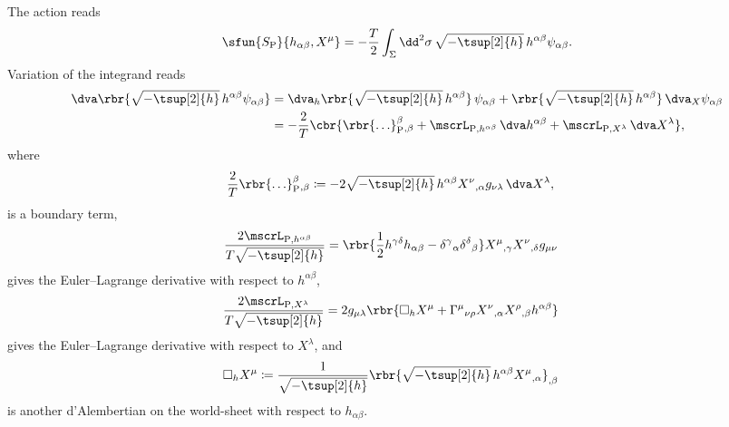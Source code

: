 \documentclass[a4paper,11pt]{article}
\begin{document}
The action reads \cite{Deser_1976,Brink_1976,Polyakov1981}
\begin{align}
\sfun{S_\text{P}}{h_{\alpha\beta}, X^{\mu}} = -\frac{T}{2} \int_{\Sigma}
\dd^2 \sigma\, \sqrt{-\tsup[2]{h}}\, h^{\alpha\beta} \psi_{\alpha\beta}.
\end{align}
Variation of the integrand reads
\begin{align}
\dva \rbr{\sqrt{-\tsup[2]{h}}\, h^{\alpha\beta} \psi_{\alpha\beta}}
&= \dva_h \rbr{\sqrt{-\tsup[2]{h}}\, h^{\alpha\beta}}\, \psi_{\alpha\beta}
+ \rbr{\sqrt{-\tsup[2]{h}}\, h^{\alpha\beta}}\, \dva_X  \psi_{\alpha\beta}
\nonumber \\
&= - \frac{2}{T} \cbr{ \rbr{\ldots}_{\text{P}}^{\beta}{}_{,\beta} + 
\mscrL_{\text{P}, h^{\alpha\beta}}\, \dva h^{\alpha\beta} +
\mscrL_{\text{P}, X^{\lambda}}\, \dva X^{\lambda} },
\end{align}
where
\begin{align}
\frac{2}{T} \rbr{\ldots}_{\text{P}}^{\beta}{}_{,\beta} &\coloneqq
- 2\sqrt{-\tsup[2]{h}}\, 
h^{\alpha\beta} X^{\nu}{}_{,\alpha} g_{\nu\lambda}\,\dva X^{\lambda},
\end{align}
is a boundary term,
\begin{align}
\frac{2\mscrL_{\text{P}, h^{\alpha\beta}}}{T \sqrt{-\tsup[2]{h}}} &= 
\rbr{\frac{1}{2} h^{\gamma\delta} h_{\alpha\beta} -
	\delta^{\gamma}{}_{\alpha} \delta^{\delta}{}_{\beta}}
X^{\mu}{}_{,\gamma} X^{\nu}{}_{,\delta} g_{\mu\nu}
\end{align}
gives the Euler--Lagrange derivative with respect to $h^{\alpha\beta}$,
\begin{align}
\frac{2 \mscrL_{\text{P}, X^{\lambda}}}{T\sqrt{-\tsup[2]{h}}}  &= 2
g_{\mu\lambda}\rbr{\square_h X^{\mu} +
\Gamma^{\mu}{}_{\nu\rho} X^{\nu}{}_{,\alpha} X^{\rho}{}_{,\beta} 
h^{\alpha\beta}}
\end{align}
gives the Euler--Lagrange derivative with respect to $X^{\lambda}$, and
\begin{align}
\square_h X^{\mu} &\coloneqq
\frac{1}{\sqrt{-\tsup[2]{h}}} \rbr{\sqrt{-\tsup[2]{h}}\, 
	h^{\alpha\beta} X^{\mu}{}_{,\alpha}}_{,\beta}
\end{align}
is another d'Alembertian on the world-sheet with respect to $h_{\alpha\beta}$.


\printbibliography
\end{document}
